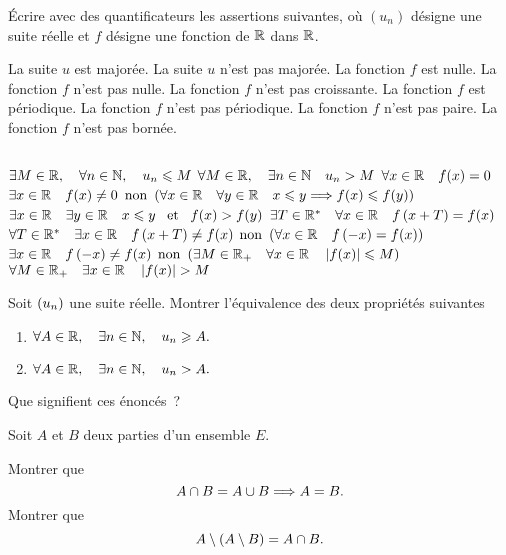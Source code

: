 \documentclass{magnolia}
\begin{document}
Écrire avec des quantificateurs les assertions suivantes, où $(u_n)$ désigne une
suite réelle et $f$ désigne une fonction de $\mathbb{R}$ dans $\mathbb{R}$.
\begin{questions}
\question La suite $u$ est majorée.
\question La suite $u$ n'est pas majorée.
\question La fonction $f$ est nulle.
\question La fonction $f$ n'est pas nulle.
\question La fonction $f$ n'est pas croissante.
\question La fonction $f$ est périodique.
\question La fonction $f$ n'est pas périodique.
\question La fonction $f$ n'est pas paire.
\question La fonction $f$ n'est pas bornée.
\end{questions}
\begin{sol}
$\quad$
\begin{questions}
\question $\exists M\in\mathbb{R} ,\quad \forall n\in\mathbb{N} ,\quad u_n\leqslant M$
\question $\forall M\in\mathbb{R} ,\quad \exists n\in\mathbb{N} \quad u_n > M$
\question $\forall x\in\mathbb{R} \quad f(x)=0$
\question $\exists x\in\mathbb{R} \quad f(x)\neq 0$
\question ${\rm non}\ \left(\forall x\in\mathbb{R} \quad \forall y\in\mathbb{R} \quad x\leqslant y \Longrightarrow
  f(x)\leqslant f(y)\right)$\\
  $\exists x\in\mathbb{R} \quad \exists y\in\mathbb{R} \quad x\leqslant y \quad\!\text{et}\quad\! f(x)>f(y)$
\question $\exists T\in{\mathbb{R}^*} \quad \forall x\in\mathbb{R} \quad f\left(x+T\right)=f(x)$\\
  $\forall T\in{\mathbb{R}^*} \quad \exists x\in\mathbb{R} \quad f\left(x+T\right)\neq f(x)$
\question ${\rm non}\ \left(\forall x\in\mathbb{R} \quad f\left(-x\right)=f(x)\right)$\\
  $\exists x\in\mathbb{R} \quad f\left(-x\right)\neq f(x)$
\question ${\rm non}\ \left(\exists M\in\mathbb{R}_+ \quad \forall x\in\mathbb{R} \quad
  \left|f(x)\right|\leqslant M\right)$\\
  $\forall M\in\RP \quad \exists x\in\R \quad \abs{f(x)}>M$
\end{questions}
\end{sol}

Soit $\left(u_n\right)$ une suite réelle. Montrer l'équivalence des deux propriétés
suivantes
\begin{enumerate}
\item $\forall A\in\mathbb{R} ,\quad \exists n\in\mathbb{N} ,\quad u_n \geqslant A.$
\item $\forall A\in\mathbb{R} ,\quad \exists n\in\mathbb{N} ,\quad u_n > A.$
\end{enumerate}
Que signifient ces énoncés~?


Soit $A$ et $B$ deux parties d'un ensemble $E$.
\begin{questions}
\question Montrer que
   \[A\cap B=A\cup B \Longrightarrow A=B.\]
\question Montrer que
  \[A\setminus\left(A\setminus B\right)=A\cap B.\]
\end{questions}
\end{document}
